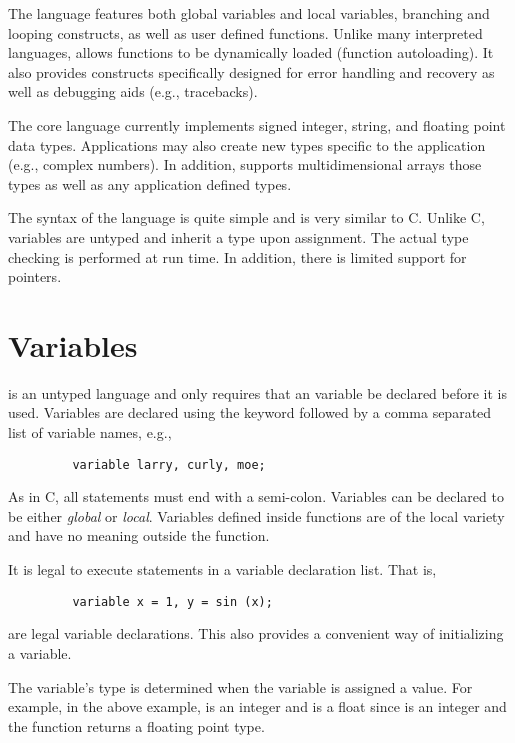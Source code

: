    The \slang{} language features both global variables and local variables,
   branching and looping constructs, as well as user defined functions.
   Unlike many interpreted languages, \slang{} allows functions to be
   dynamically loaded (function autoloading).  It also provides constructs
   specifically designed for error handling and recovery as well as
   debugging aids (e.g., tracebacks).

   The core language currently implements signed integer, string, and
   floating point data types.  Applications may also create new types
   specific to the application (e.g., complex numbers).  In addition, \slang{}
   supports multidimensional arrays those types as well as any application
   defined types.

   The syntax of the language is quite simple and is very similar to C.
   Unlike C, \slang{} variables are untyped and inherit a type upon
   assignment. The actual type checking is performed at run time.  In
   addition, there is limited support for pointers.

  
\section{Variables}

   \slang{} is an untyped language and only requires that an variable be
   declared before it is used.  Variables are declared using the 
   keyword followed by a comma separated list of variable names, e.g.,
\begin{verbatim}
         variable larry, curly, moe;
\end{verbatim}
   As in C, all statements must end with a semi-colon.  Variables can be
   declared to be either {\em global} or {\em local}. Variables defined
   inside functions are of the local variety and have no meaning outside the
   function.

   It is legal to execute statements in a variable declaration list.  That
   is,
\begin{verbatim}
         variable x = 1, y = sin (x);
\end{verbatim}
   are legal variable declarations.  This also provides a convenient way
   of initializing a variable.  
   
   The variable's type is determined when the variable is assigned a value.
   For example, in the above example,  is an integer and  is a float
   since  is an integer and the  function returns a floating point
   type.
   

